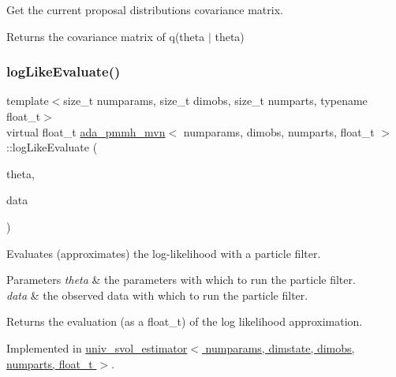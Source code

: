 Get the current proposal distribution\textquotesingle{}s covariance matrix. 

\begin{DoxyReturn}{Returns}
the covariance matrix of q(theta\textquotesingle{} $\vert$ theta) 
\end{DoxyReturn}
\mbox{\label{classada__pmmh__mvn_a82d43085173fd0ed33ee42de9be48b77}} 
\subsubsection{\texorpdfstring{log\+Like\+Evaluate()}{logLikeEvaluate()}}
{\footnotesize\ttfamily template$<$size\+\_\+t numparams, size\+\_\+t dimobs, size\+\_\+t numparts, typename float\+\_\+t$>$ \\
virtual float\+\_\+t \hyperlink{classada__pmmh__mvn}{ada\+\_\+pmmh\+\_\+mvn}$<$ numparams, dimobs, numparts, float\+\_\+t $>$\+::log\+Like\+Evaluate (\begin{DoxyParamCaption}\item[{const \hyperlink{classparamPack}{param\+Pack}$<$ float\+\_\+t $>$ \&}]{theta,  }\item[{const std\+::vector$<$ osv $>$ \&}]{data }\end{DoxyParamCaption})\hspace{0.3cm}{\ttfamily [pure virtual]}}



Evaluates (approximates) the log-\/likelihood with a particle filter. 


\begin{DoxyParams}{Parameters}
{\em theta} & the parameters with which to run the particle filter. \\
\hline
{\em data} & the observed data with which to run the particle filter. \\
\hline
\end{DoxyParams}
\begin{DoxyReturn}{Returns}
the evaluation (as a float\+\_\+t) of the log likelihood approximation. 
\end{DoxyReturn}


Implemented in \hyperlink{classuniv__svol__estimator_a1223321e7875a4d40f9c4817753a2e01}{univ\+\_\+svol\+\_\+estimator$<$ numparams, dimstate, dimobs, numparts, float\+\_\+t $>$}.

